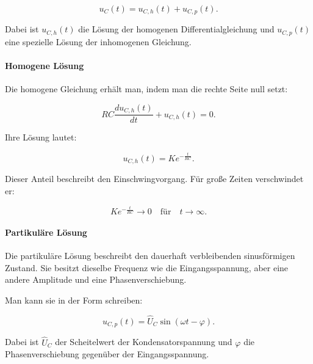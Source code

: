 \begin{equation}
	u_C(t)
	=
	u_{C,h}(t)
	+
	u_{C,p}(t).
	\label{eq:rc-loesung-homogen-partikulaer}
\end{equation}

Dabei ist \(u_{C,h}(t)\) die Lösung der homogenen Differentialgleichung und
\(u_{C,p}(t)\) eine spezielle Lösung der inhomogenen Gleichung.

\paragraph{Homogene Lösung}

Die homogene Gleichung erhält man, indem man die rechte Seite null setzt:

\begin{equation}
	RC \frac{du_{C,h}(t)}{dt}
	+
	u_{C,h}(t)
	=
	0.
	\label{eq:rc-homogene-dgl}
\end{equation}

Ihre Lösung lautet:

\begin{equation}
	u_{C,h}(t)
	=
	K e^{-\frac{t}{RC}}.
	\label{eq:rc-homogene-loesung}
\end{equation}

Dieser Anteil beschreibt den Einschwingvorgang. Für große Zeiten verschwindet
er:

\begin{equation}
	K e^{-\frac{t}{RC}}
	\rightarrow 0
	\quad \text{für} \quad t \rightarrow \infty.
	\label{eq:rc-homogene-loesung-verschwindet}
\end{equation}

\paragraph{Partikuläre Lösung}

Die partikuläre Lösung beschreibt den dauerhaft verbleibenden sinusförmigen
Zustand. Sie besitzt dieselbe Frequenz wie die Eingangsspannung, aber eine
andere Amplitude und eine Phasenverschiebung.

Man kann sie in der Form schreiben:

\begin{equation}
	u_{C,p}(t)
	=
	\hat{U}_C \sin(\omega t - \varphi).
	\label{eq:rc-partikulaere-loesung-ansatz}
\end{equation}

Dabei ist \(\hat{U}_C\) der Scheitelwert der Kondensatorspannung und
\(\varphi\) die Phasenverschiebung gegenüber der Eingangsspannung.

